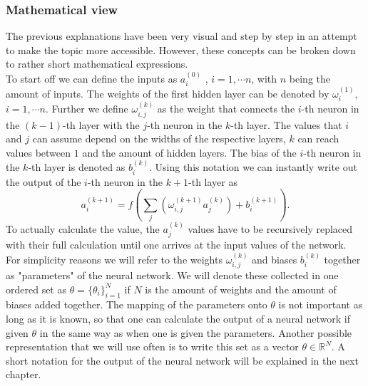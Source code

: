 \subsubsection{Mathematical view}
The previous explanations have been very visual and step by step in an attempt to make the topic more accessible. However, these concepts can be broken down to rather short mathematical expressions.\\
To start off we can define the inputs as $a_i^{(0)}$ , $i =  1, \dotsb n$, with $n$ being the amount of inputs. The weights of the first hidden layer can be denoted by $\omega_{i}^{(1)}$, $i =  1, \dotsb n$. Further we define $\omega_{i,j}^{(k)}$ as the weight that connects the $i$-th neuron in the $(k-1)$-th layer with the $j$-th neuron in the $k$-th layer. The values that $i$ and $j$ can assume depend on the widths of the respective layers, $k$ can reach values between $1$ and the amount of hidden layers. The bias of the $i$-th neuron in the $k$-th layer is denoted as $b_i^{(k)}$. Using this notation we can instantly write out the output of the $i$-th neuron in the $k+1$-th layer as
\begin{equation}
	a_i^{(k+1)} = f\left(\sum_j \left(\omega_{i,j}^{(k+1)}a_j^{(k)}\right) + b_i^{(k+1)}\right).
\end{equation}
To actually calculate the value, the $a_j^{(k)}$ values have to be recursively replaced with their full calculation until one arrives at the input values of the network.\\
For simplicity reasons we will refer to the weights $\omega_{i,j}^{(k)}$ and biases $b_i^{(k)}$ together as "parameters" of the neural network. We will denote these collected in one ordered set as $\theta = \{\theta_i\}_{i=1}^{N}$ if $N$ is the amount of weights and the amount of biases added together. The mapping of the parameters onto $\theta$ is not important as long as it is known, so that one can calculate the output of a neural network if given $\theta$ in the same way as when one is given the parameters. Another possible representation that we will use often is to write this set as a vector $\theta \in \mathbb{R}^N$. A short notation for the output of the neural network will be explained in the next chapter.
